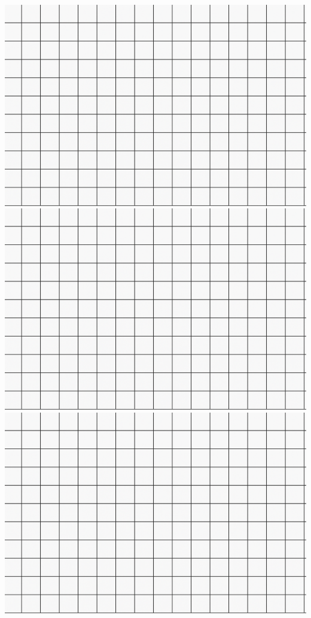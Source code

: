\documentclass[12pt, a4paper, notitlepage]{extreport}
\begin{document}
    \maketeampage

    \begin{multicols*}{2}

	
    \end{multicols*}


	\begin{center}
	\includegraphics[scale=0.5]{../png/rectangular_grid.png}
    \includegraphics[scale=0.5]{../png/rectangular_grid.png}
    \includegraphics[scale=0.5]{../png/rectangular_grid.png}

\end{center}
\end{document}
